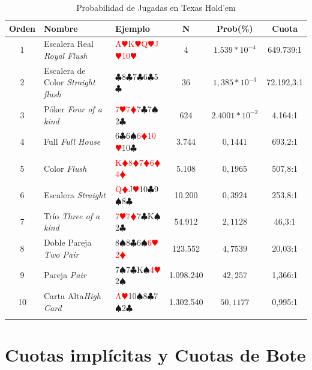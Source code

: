 \begin{longtable}[c]{|c|m{4em}|m{8em}|c|c|c|}
\hline
\rowcolor{lightgray} Orden & Nombre & Ejemplo &  N & Prob(\%) & Cuota\\ \hline
1 & Escalera Real \textit{Royal Flush}&\textcolor{red}{A$\varheartsuit$K$\varheartsuit$Q$\varheartsuit$J$\varheartsuit$10$\varheartsuit$}& 4 &$1.539*10^{-4}$&649.739:1\\
\hline
2 & Escalera de Color \textit{Straight flush}&$\clubsuit$8$\clubsuit$7$\clubsuit$6$\clubsuit$5$\clubsuit$&36& $1,385*10^{-3}$&72.192,3:1\\
\hline
3 & Póker \textit{ Four of a kind}& \textcolor{red}{7$\varheartsuit$7$\vardiamondsuit$}7$\clubsuit$7$\spadesuit$2$\clubsuit$ & 624 & $2.4001*10^{-2}$&4.164:1 \\
\hline
4 & Full \textit{Full House}&6$\clubsuit$6$\spadesuit$\textcolor{red}{6$\vardiamondsuit$10$\varheartsuit$}10$\clubsuit$ &3.744&$0,1441$&693,2:1 \\
\hline
5 & Color \textit{Flush} & \textcolor{red}{K$\vardiamondsuit$8$\vardiamondsuit$7$\vardiamondsuit$6$\vardiamondsuit$4$\vardiamondsuit$} & 5.108 &$0,1965$& 507,8:1\\
\hline
6 & Escalera \textit{Straight}&\textcolor{red}{Q$\vardiamondsuit$J$\varheartsuit$}10$\clubsuit$9$\spadesuit$8$\clubsuit$ &10.200& $0,3924$&253,8:1 \\
\hline
7 & Trío \textit{Three of a kind}&\textcolor{red}{7$\varheartsuit$7$\vardiamondsuit$}7$\clubsuit$K$\spadesuit$2$\clubsuit$& 54.912 &$2,1128$&46,3:1 \\
\hline
8 & Doble Pareja \textit{Two Pair}& 8$\spadesuit$8$\clubsuit$6$\spadesuit$\textcolor{red}{6$\varheartsuit$2$\vardiamondsuit$}& 123.552 & $4,7539$&20,03:1\\
\hline
9 & Pareja \textit{Pair}& 7$\spadesuit$7$\clubsuit$K$\spadesuit$\textcolor{red}{4$\varheartsuit$}2$\spadesuit$  & 1.098.240 & $42,257$&1,366:1 \\
\hline
10 & Carta Alta\textit{High Card}&\textcolor{red}{A$\varheartsuit$}10$\spadesuit$8$\clubsuit$7$\spadesuit$2$\clubsuit$ & 1.302.540 & $50,1177$&0,995:1 \\
\hline
\caption{Probabilidad de Jugadas en Texas Hold'em}
\label{tab:prob_jugadas}
\end{longtable}


\section {Cuotas implícitas y Cuotas de Bote}
\label{sec:odd}

